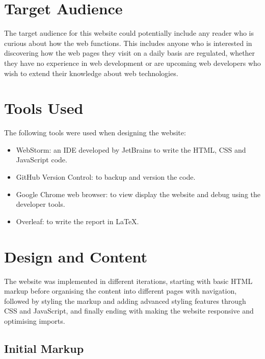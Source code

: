 \documentclass[letterpaper,12pt]{article}
\begin{document}

\section{Target Audience}
\label{sec:target-audience}

The target audience for this website could potentially include any reader who is curious about how the web functions. This includes anyone who is interested in discovering how the web pages they visit on a daily basis are regulated, whether they have no experience in web development or are upcoming web developers who wish to extend their knowledge about web technologies.


\section{Tools Used}
\label{sec:tools-used}

The following tools were used when designing the website:
\begin{itemize}
    \item WebStorm: an IDE developed by JetBrains \cite{webstorm} to write the HTML, CSS and JavaScript code.
    \item GitHub Version Control: to backup and version the code.
    \item Google Chrome web browser: to view display the website and debug using the developer tools.
    \item Overleaf: to write the report in \LaTeX.
\end{itemize}


\section{Design and Content}
\label{sec:design-content}

The website was implemented in different iterations, starting with basic HTML markup before organising the content into different pages with navigation, followed by styling the markup and adding advanced styling features through CSS and JavaScript, and finally ending with making the website responsive and optimising imports. 

\subsection{Initial Markup}
\label{sec:design-content-initial-markup}
\end{document}
